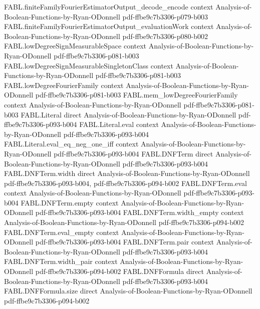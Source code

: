 \begin{theorem}
\proofstep
  {FABL.finiteFamilyFourierEstimatorOutput_decode_encode}
  {context}
  {Analysis-of-Boolean-Functions-by-Ryan-ODonnell}
  {pdf-ffbe9c7b3306-p079-b003}
\proofstep
  {FABL.finiteFamilyFourierEstimatorOutput_evaluationWork}
  {context}
  {Analysis-of-Boolean-Functions-by-Ryan-ODonnell}
  {pdf-ffbe9c7b3306-p080-b002}
\proofstep
  {FABL.lowDegreeSignMeasurableSpace}
  {context}
  {Analysis-of-Boolean-Functions-by-Ryan-ODonnell}
  {pdf-ffbe9c7b3306-p081-b003}
\proofstep
  {FABL.lowDegreeSignMeasurableSingletonClass}
  {context}
  {Analysis-of-Boolean-Functions-by-Ryan-ODonnell}
  {pdf-ffbe9c7b3306-p081-b003}
\proofstep
  {FABL.lowDegreeFourierFamily}
  {context}
  {Analysis-of-Boolean-Functions-by-Ryan-ODonnell}
  {pdf-ffbe9c7b3306-p081-b003}
\proofstep
  {FABL.mem_lowDegreeFourierFamily}
  {context}
  {Analysis-of-Boolean-Functions-by-Ryan-ODonnell}
  {pdf-ffbe9c7b3306-p081-b003}
\proofstep
  {FABL.Literal}
  {direct}
  {Analysis-of-Boolean-Functions-by-Ryan-ODonnell}
  {pdf-ffbe9c7b3306-p093-b004}
\proofstep
  {FABL.Literal.eval}
  {context}
  {Analysis-of-Boolean-Functions-by-Ryan-ODonnell}
  {pdf-ffbe9c7b3306-p093-b004}
\proofstep
  {FABL.Literal.eval_eq_neg_one_iff}
  {context}
  {Analysis-of-Boolean-Functions-by-Ryan-ODonnell}
  {pdf-ffbe9c7b3306-p093-b004}
\proofstep
  {FABL.DNFTerm}
  {direct}
  {Analysis-of-Boolean-Functions-by-Ryan-ODonnell}
  {pdf-ffbe9c7b3306-p093-b004}
\proofstep
  {FABL.DNFTerm.width}
  {direct}
  {Analysis-of-Boolean-Functions-by-Ryan-ODonnell}
  {pdf-ffbe9c7b3306-p093-b004,
    pdf-ffbe9c7b3306-p094-b002}
\proofstep
  {FABL.DNFTerm.eval}
  {context}
  {Analysis-of-Boolean-Functions-by-Ryan-ODonnell}
  {pdf-ffbe9c7b3306-p093-b004}
\proofstep
  {FABL.DNFTerm.empty}
  {context}
  {Analysis-of-Boolean-Functions-by-Ryan-ODonnell}
  {pdf-ffbe9c7b3306-p093-b004}
\proofstep
  {FABL.DNFTerm.width_empty}
  {context}
  {Analysis-of-Boolean-Functions-by-Ryan-ODonnell}
  {pdf-ffbe9c7b3306-p094-b002}
\proofstep
  {FABL.DNFTerm.eval_empty}
  {context}
  {Analysis-of-Boolean-Functions-by-Ryan-ODonnell}
  {pdf-ffbe9c7b3306-p093-b004}
\proofstep
  {FABL.DNFTerm.pair}
  {context}
  {Analysis-of-Boolean-Functions-by-Ryan-ODonnell}
  {pdf-ffbe9c7b3306-p093-b004}
\proofstep
  {FABL.DNFTerm.width_pair}
  {context}
  {Analysis-of-Boolean-Functions-by-Ryan-ODonnell}
  {pdf-ffbe9c7b3306-p094-b002}
\proofstep
  {FABL.DNFFormula}
  {direct}
  {Analysis-of-Boolean-Functions-by-Ryan-ODonnell}
  {pdf-ffbe9c7b3306-p093-b004}
\proofstep
  {FABL.DNFFormula.size}
  {direct}
  {Analysis-of-Boolean-Functions-by-Ryan-ODonnell}
  {pdf-ffbe9c7b3306-p094-b002}

\end{theorem}
